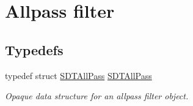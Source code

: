 \hypertarget{group__allpass}{}\section{Allpass filter}
\label{group__allpass}
\subsection*{Typedefs}
\begin{DoxyCompactItemize}
\item 
\hypertarget{group__allpass_gaf7204b2111eb2234dc0c510955013960}{}typedef struct \hyperlink{group__allpass_gaf7204b2111eb2234dc0c510955013960}{S\+D\+T\+All\+Pass} \hyperlink{group__allpass_gaf7204b2111eb2234dc0c510955013960}{S\+D\+T\+All\+Pass}\label{group__allpass_gaf7204b2111eb2234dc0c510955013960}

\begin{DoxyCompactList}\small\item\em Opaque data structure for an allpass filter object. \end{DoxyCompactList}\end{DoxyCompactItemize}
